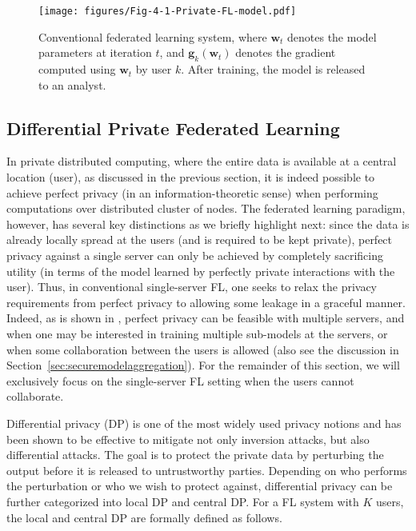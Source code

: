 \begin{figure}[t]
    \centering
    \texttt{[image: figures/Fig-4-1-Private-FL-model.pdf]}
    \caption{Conventional federated learning system, where $\mathbf{w}_t$ denotes the model parameters at iteration $t$, and $\mathbf{g}_k(\mathbf{w}_t)$ denotes the gradient computed using $\mathbf{w}_t$ by user $k$. After training, the model is released to an analyst.
    }
    \label{fig:FL_system_model}
\end{figure}



\subsection{Differential Private Federated Learning}

In private distributed computing, where the entire data is available at a central location (user), as discussed in the previous section, it is indeed possible to achieve perfect privacy (in an information-theoretic sense) when performing computations over distributed cluster of nodes. The federated learning paradigm, however, has several key distinctions as we briefly highlight next: since the data is already locally spread at the users (and is required to be kept private), perfect privacy against a single server can only be achieved by completely sacrificing utility (in terms of the model learned by perfectly private interactions with the user). Thus, in conventional single-server FL, one seeks to relax the privacy requirements from perfect privacy to allowing some leakage in a graceful manner. Indeed, as is shown in \cite{Jia_Jafar_XSTPFSL}, perfect privacy can be feasible with multiple servers, and when one may be interested in training multiple sub-models at the servers, or when some collaboration between the users is allowed (also see the discussion in Section~\ref{sec:securemodelaggregation}). For the remainder of this section, we will exclusively focus on the single-server FL setting when the users cannot collaborate. 


Differential privacy (DP) \cite{DworkRothDPBook} is one of the most widely used privacy notions and has been shown to be effective to mitigate not only inversion attacks, but also differential attacks. The goal is to protect the private data by perturbing the output before it is released to untrustworthy parties. Depending on who performs the perturbation or who we wish to protect against, differential privacy can be further categorized into local DP and central DP. For a FL system with $K$ users, the local and central DP are formally defined as follows.

